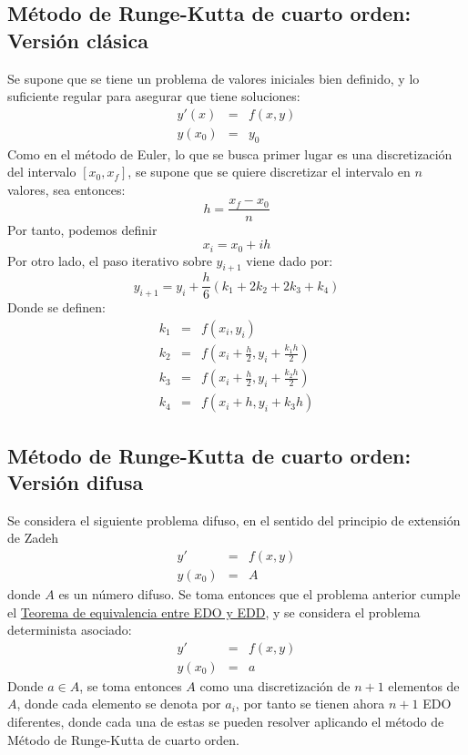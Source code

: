 \subsection{Método de Runge-Kutta de cuarto orden: Versión clásica}
Se supone que se tiene un problema de valores iniciales bien definido, y lo suficiente regular para asegurar que tiene soluciones:
\[
\begin{array}{ccc}
y'(x) & = &f(x, y)  \\
y(x_0) & = & y_0
\end{array}
\]
Como en el método de Euler, lo que se busca primer lugar es una discretización del intervalo $[x_0, x_f]$, se supone que se quiere discretizar el intervalo en $n$ valores, sea entonces:
\[
	h = \frac{x_f - x_0}{n}
\]
Por tanto, podemos definir 
\[
	x_i = x_0 + i h
\]
Por otro lado, el paso iterativo sobre $y_{i+1}$ viene dado por:
\[
	y_{i+1} = y_i + \frac{h}{6} (k_1 + 2k_2 + 2k_3 + k_4)
\]
Donde se definen:
\[
\begin{array}{ccc}
	k_1 & = & f(x_i, y_i) \\
	k_2 & = & f\left(x_i + \frac{h}{2}, y_i + \frac{k_1 h}{2}\right) \\
	k_3 & = & f\left(x_i + \frac{h}{2}, y_i + \frac{k_2 h}{2}\right) \\
	k_4 & = & f(x_i + h, y_i + k_3 h)
\end{array}
\]

\subsection{Método de Runge-Kutta de cuarto orden: Versión difusa}
Se considera el siguiente problema difuso, en el sentido del principio de extensión de Zadeh
\[
\begin{array}{ccc}
y' & = &f(x, y)  \\
y(x_0) & = & A
\end{array}
\]
donde $A$ es un número difuso. Se toma entonces que el problema anterior cumple el \hyperref[teorema:equivalencia]{Teorema de equivalencia entre EDO y EDD}, y se considera el problema determinista asociado:
\[
\begin{array}{ccc}
y' & = &f(x, y)  \\
y(x_0) & = & a
\end{array}
\]
Donde $a \in A$, se toma entonces $A$ como una discretización de $n+1$ elementos de $A$, donde cada elemento se denota por $a_i$, por tanto se tienen ahora $n+1$ EDO diferentes, donde cada una de estas se pueden resolver aplicando el método de Método de Runge-Kutta de cuarto orden.

